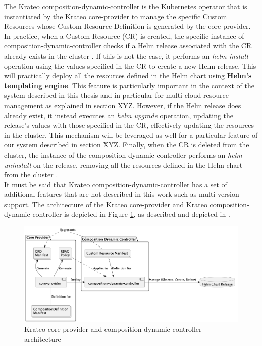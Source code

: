 The Krateo composition-dynamic-controller is the Kubernetes operator that is instantiated by the Krateo core-provider to manage the specific Custom Resources whose Custom Resource Definition is generated by the core-provider.
In practice, when a Custom Resource (CR) is created, the specific instance of composition-dynamic-controller checks if a Helm release associated with the CR already exists in the cluster \cite{krateo_composition_dynamic_controller}. 
If this is not the case, it performs an \textit{helm install} operation using the values specified in the CR to create a new Helm release. This will practically deploy all the resources defined in the Helm chart using \textbf{Helm's templating engine}.
This feature is particularly important in the context of the system described in this thesis and in particular for multi-cloud resource management as explained in section XYZ.
However, if the Helm release does already exist, it instead executes an \textit{helm upgrade} operation, updating the release's values with those specified in the CR, effectively updating the resources in the cluster.
This mechanism will be leveraged as well for a particular feature of our system described in section XYZ.
Finally, when the CR is deleted from the cluster, the instance of the composition-dynamic-controller performs an \textit{helm uninstall} on the release, removing all the resources defined in the Helm chart from the cluster \cite{krateo_composition_dynamic_controller}. \\
It must be said that Krateo composition-dynamic-controller has a set of additional features that are not described in this work such as multi-version support.
The architecture of the Krateo core-provider and Krateo composition-dynamic-controller is depicted in Figure \ref{fig:krateo_core_provider}, as described and depicted in \cite{krateo_core_provider}.

\begin{figure}[htb]
    \centering
    \includegraphics[width=1\linewidth]{images/kraeto_core_provider.png}
    \caption{Krateo core-provider and composition-dynamic-controller architecture \cite{krateo_core_provider}}
    \label{fig:krateo_core_provider}
\end{figure}

